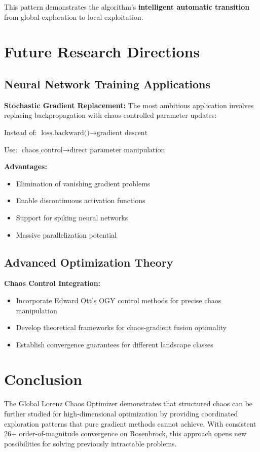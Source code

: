 \documentclass[11pt,a4paper]{article}
\begin{document}
This pattern demonstrates the algorithm's \textbf{intelligent automatic transition} from global exploration to local exploitation.

\section{Future Research Directions}

\subsection{Neural Network Training Applications}

\textbf{Stochastic Gradient Replacement:}
The most ambitious application involves replacing backpropagation with chaos-controlled parameter updates:

Instead of: $\text{loss.backward()} \rightarrow \text{gradient descent}$

Use: $\text{chaos\_control} \rightarrow \text{direct parameter manipulation}$

\textbf{Advantages:}
\begin{itemize}
\item Elimination of vanishing gradient problems
\item Enable discontinuous activation functions
\item Support for spiking neural networks
\item Massive parallelization potential
\end{itemize}

\subsection{Advanced Optimization Theory}

\textbf{Chaos Control Integration:}
\begin{itemize}
\item Incorporate Edward Ott's OGY control methods for precise chaos manipulation
\item Develop theoretical frameworks for chaos-gradient fusion optimality
\item Establish convergence guarantees for different landscape classes
\end{itemize}

\section{Conclusion}

The Global Lorenz Chaos Optimizer demonstrates that structured chaos can be further studied for high-dimensional optimization by providing coordinated exploration patterns that pure gradient methods cannot achieve. With consistent 26+ order-of-magnitude convergence on Rosenbrock, this approach opens new possibilities for solving previously intractable problems.
\end{document}
